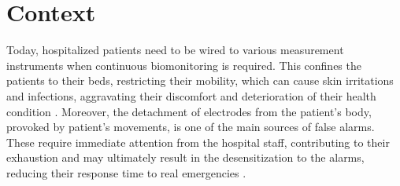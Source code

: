 

\section{Context}





Today, hospitalized patients need to be wired to various measurement instruments when continuous biomonitoring is required. This confines the patients to their beds, restricting their mobility, which can cause skin irritations and infections, aggravating their discomfort and deterioration of their health condition \cite{Darwish2011}. Moreover, the detachment of electrodes from the patient's body, provoked by patient's movements, is one of the main sources of false alarms. These require immediate attention from the hospital staff, contributing to their exhaustion and may ultimately result in the desensitization to the alarms, reducing their response time to real emergencies \cite{DursunErgezen2020}.



